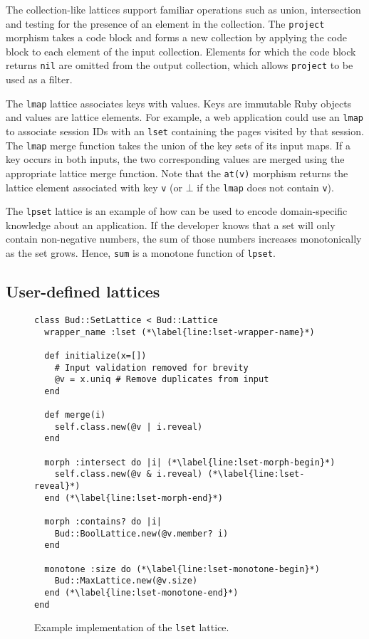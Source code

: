 The collection-like lattices support familiar operations such as union,
intersection and testing for the presence of an element in the collection. The
\texttt{project} morphism takes a code block and forms a new collection by
applying the code block to each element of the input collection. Elements for
which the code block returns \texttt{nil} are omitted from the output
collection, which allows \texttt{project} to be used as a filter.

The \texttt{lmap} lattice associates keys with values. Keys are immutable Ruby
objects and values are lattice elements. For example, a web application could
use an \texttt{lmap} to associate session IDs with an \texttt{lset} containing
the pages visited by that session. The \texttt{lmap} merge function takes the
union of the key sets of its input maps. If a key occurs in both inputs, the two
corresponding values are merged using the appropriate lattice merge
function. Note that the \texttt{at(v)} morphism returns the lattice element
associated with key \texttt{v} (or $\bot$ if the \texttt{lmap} does not contain
\texttt{v}).

The \texttt{lpset} lattice is an example of how \lang can be used to encode
domain-specific knowledge about an application. If the developer knows that a
set will only contain non-negative numbers, the sum of those numbers increases
monotonically as the set grows. Hence, \texttt{sum} is a monotone function of
\texttt{lpset}.%

\subsection{User-defined lattices}
\begin{figure}[t]
\begin{scriptsize}
\begin{lstlisting}[deletekeywords={lset}]
class Bud::SetLattice < Bud::Lattice
  wrapper_name :lset (*\label{line:lset-wrapper-name}*)

  def initialize(x=[])
    # Input validation removed for brevity
    @v = x.uniq # Remove duplicates from input
  end

  def merge(i)
    self.class.new(@v | i.reveal)
  end

  morph :intersect do |i| (*\label{line:lset-morph-begin}*)
    self.class.new(@v & i.reveal) (*\label{line:lset-reveal}*)
  end (*\label{line:lset-morph-end}*)

  morph :contains? do |i|
    Bud::BoolLattice.new(@v.member? i)
  end

  monotone :size do (*\label{line:lset-monotone-begin}*)
    Bud::MaxLattice.new(@v.size)
  end (*\label{line:lset-monotone-end}*)
end
\end{lstlisting}
\end{scriptsize}
\caption{Example implementation of the \texttt{lset} lattice.}
\label{fig:lattice-lset}
\end{figure}

